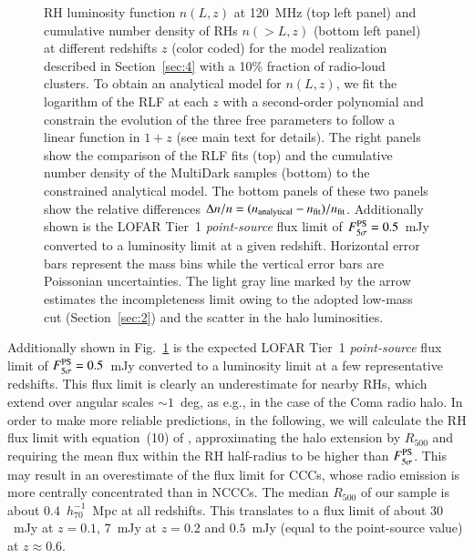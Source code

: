 \documentclass[useAMS,usenatbib]{mn2e}
\begin{document}
\begin{figure}
\caption{RH luminosity function $n(L,z)$ at 120~MHz (top left panel) and cumulative
  number density of RHs  $n(>L,z)$ (bottom left panel) at different redshifts $z$ (color
  coded) for the model realization described in Section~\ref{sec:4} with a 10\%
  fraction of radio-loud clusters. To obtain an analytical model for $n(L,z)$,
  we fit the logarithm of the RLF at each $z$ with a second-order polynomial and
  constrain the evolution of the three free parameters to follow a linear
  function in $1+z$ (see main text for details). The right panels show the
  comparison of the RLF fits (top) and the cumulative number density of the
  MultiDark samples (bottom) to the constrained analytical model. The bottom panels of these
  two panels show the relative differences $\Delta n / n =
  (n_{{\mathrm{analytical}}} - n_{{\mathrm{fit}}})/n_{{\mathrm{fit}}}$. Additionally shown is
  the LOFAR Tier~1 \emph{point-source} flux limit of
  $F_{5\sigma}^{{\mathrm{PS}}}=0.5$~mJy \citep{2012JApA..tmp...34R} converted to a
  luminosity limit at a given redshift. Horizontal error bars represent the mass
  bins while the vertical error bars are Poissonian uncertainties.  The light
  gray line marked by the arrow estimates the incompleteness limit owing to the
  adopted low-mass cut (Section~\ref{sec:2}) and the scatter in the halo
  luminosities.}
\label{fig:RLF_120}
\end{figure} 

Additionally shown in Fig.~\ref{fig:RLF_120} is the expected LOFAR Tier~1
\emph{point-source} flux limit of $F_{5\sigma}^{{\mathrm{PS}}}=0.5$~mJy
\citep{2012JApA..tmp...34R} converted to a luminosity limit at a few representative
redshifts. This flux limit is clearly an underestimate for nearby RHs, which
extend over angular scales $\sim1$~deg, as e.g., in the case of the Coma radio
halo. In order to make more reliable predictions, in the following, we will
calculate the RH flux limit with equation~(10) of \cite{2010A&A...509A..68C},
approximating the halo extension by $R_{500}$ and requiring the mean flux within
the RH half-radius to be higher than $F_{5\sigma}^{{\mathrm{PS}}}$. This may result
in an overestimate of the flux limit for CCCs, whose radio emission is more
centrally concentrated than in NCCCs. The median $R_{500}$ of our sample is
about $0.4$~$h_{70}^{-1}$~Mpc at all redshifts. This translates to a flux limit
of about $30$~mJy at $z = 0.1$, $7$~mJy at $z = 0.2$ and $0.5$~mJy (equal to the
point-source value) at $z \approx 0.6$.
\end{document}
